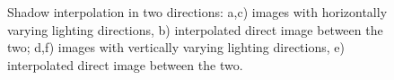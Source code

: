 \begin{figure}[t]
{\label{fig:subfig3}
}
\caption{Shadow interpolation in two directions: a,c) images with horizontally
varying lighting directions, b) interpolated direct image between the two; d,f)
images with vertically varying lighting directions, e) interpolated direct image
between the two.}  \label{fig:intExample}
\end{figure}

